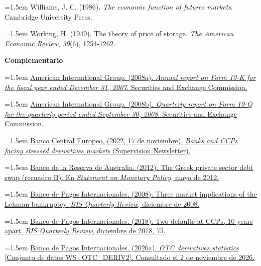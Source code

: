 \documentclass[10pt,a4paper]{article}
\begin{document}
\noindent\hangindent=1.5em Williams, J. C. (1986). \textit{The economic function of futures markets}. Cambridge University Press.

\noindent\hangindent=1.5em Working, H. (1949). The theory of price of storage. \textit{The American Economic Review}, \textit{39}(6), 1254-1262.

\textbf{Complementario}

\noindent\hangindent=1.5em \href{https://www.sec.gov/Archives/edgar/data/5272/000095012308002280/y44393e10vk.htm}{American International Group. (2008a). \textit{Annual report on Form 10-K for the fiscal year ended December 31, 2007}. Securities and Exchange Commission.}

\noindent\hangindent=1.5em \href{https://www.sec.gov/Archives/edgar/data/5272/000095012308014821/y72212e10vq.htm}{American International Group. (2008b). \textit{Quarterly report on Form 10-Q for the quarterly period ended September 30, 2008}. Securities and Exchange Commission.}

\noindent\hangindent=1.5em \href{https://www.bankingsupervision.europa.eu/press/supervisory-newsletters/newsletter/2022/html/ssm.nl221117.en.html}{Banco Central Europeo. (2022, 17 de noviembre). \textit{Banks and CCPs facing stressed derivatives markets} (Supervision Newsletter).}

\noindent\hangindent=1.5em \href{https://www.rba.gov.au/publications/smp/2012/may/box-b.html}{Banco de la Reserva de Australia. (2012). The Greek private sector debt swap (recuadro B). En \textit{Statement on Monetary Policy}, mayo de 2012.}

\noindent\hangindent=1.5em \href{https://www.bis.org/publications/three-market-implications-lehman-bankruptcy}{Banco de Pagos Internacionales. (2008). Three market implications of the Lehman bankruptcy. \textit{BIS Quarterly Review}, diciembre de 2008.}

\noindent\hangindent=1.5em \href{https://www.bis.org/publ/qtrpdf/r_qt1812x.htm}{Banco de Pagos Internacionales. (2018). Two defaults at CCPs, 10 years apart. \textit{BIS Quarterly Review}, diciembre de 2018, 75.}

\noindent\hangindent=1.5em \href{https://data.bis.org/static/bulk/WS_OTC_DERIV2_csv_flat.zip}{Banco de Pagos Internacionales. (2026a). \textit{OTC derivatives statistics} [Conjunto de datos WS\_OTC\_DERIV2]. Consultado el 2 de noviembre de 2026.}
\end{document}
